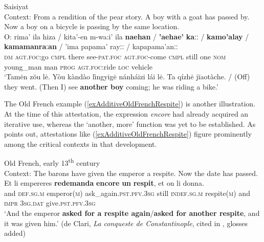 {\begin{exe}
	 Saisiyat\\
	Context: From a rendition of the pear story. A boy with a goat has passed by. Now a boy on a bicycle is passing by the same location.\\
	\gll O: rima\rq{} ila hiza / kita’-en m-wa:i\rq{} ila \textbf{naehan} / \textbf{\rq{}aehae\rq}{} \textbf{kaːː} / \textbf{kamo\rq{}alay} / \textbf{kamamanraːan} / \rq{}ima papama\rq{} rayːː / kapapama\rq{}anːː\\
	\textsc{dm} \textsc{agt}.\textsc{foc}:go \textsc{cmpl} there {} see-\textsc{pat}.\textsc{foc} \textsc{agt}.\textsc{foc}-come \textsc{cmpl} still  {} one \textsc{nom} {} young\_man {} man {} \textsc{prog} \textsc{agt}.\textsc{foc}:ride \textsc{loc} {} vehicle\\
	\glt \lq Tamėn zŏu lė. Yòu kàndào lìngyigė nánháizi lái lė. Ta qízhė jĭaotàche. / (Off) they went. (Then I) see \textbf{another boy} coming; he was riding a bike.’ \parencite[108–109]{Huang2008}
\end{exe} 

The Old French example (\ref{exAdditiveOldFrenchRespite}) is another illustration. At the time of this attestation, the expression \textit{encore} had already acquired an iterative use, whereas the \lq another, more\rq{ }function was yet to be established. As \textcite[163]{MosegaardHansen2008} points out, attestations like  (\ref{exAdditiveOldFrenchRespite}) figure prominently among the critical contexts in that development.

\begin{exe}
	\ex Old French, early 13\textsuperscript{th} century\label{exAdditiveOldFrenchRespite}\\
	Context: The barons have given the emperor a respite. Now the date has passed.\\
	\gll Et li empereres \textbf{redemanda} \textbf{encore} \textbf{un} \textbf{respit}, et on li donna.\\
	and \textsc{def}.\textsc{sg}.\textsc{m} emperor(\textsc{m}) ask\_again.\textsc{pst}.\textsc{pfv}.3\textsc{sg} still \textsc{indef}.\textsc{sg}.\textsc{m} respite(\textsc{m}) and \textsc{impr} 3\textsc{sg}.\textsc{dat} give.\textsc{pst}.\textsc{pfv}.3\textsc{sg}\\
	\glt \lq And the emperor \textbf{asked for a respite again}/\textbf{asked for another respite}, and it was given him.\rq{ }(de Clari, \textit{La conqueste de Constantinople}, cited in \cite[163–164]{MosegaardHansen2008}, glosses added)
\end{exe}

}
